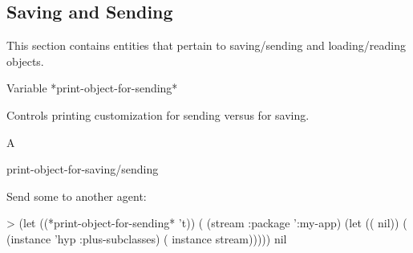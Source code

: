 \documentclass[10pt,twoside,english,pdftex]{article}
\begin{document}
\subsection{Saving and Sending}
\label{sec:saving-sending}%

This section contains  entities that pertain to
saving/sending and loading/reading objects.

\W\entities
\T\clearpage


\begin{functiondoc}{Variable}%
{*print-object-for-sending*}{}%

\fnsyntax

\fnpurpose Controls \textbf{}
printing customization for sending versus for saving.

\fnpackage {}

\fnmodule {}

\fnvaluetype A 

\fninitialvalue \nil

\begin{alsos}{print-object-for-saving/sending}
\end{alsos}

\fnexample
{}%
%
%
%
Send some   to another agent:
%
\W\supp
\begin{example}
> (let ((*print-object-for-sending* 't))
    ( (stream :package ':my-app)
      (let (( nil))
        ( (instance 'hyp :plus-subclasses)
          ( instance stream)))))
nil
\end{example}

\end{functiondoc}

\end{document}
